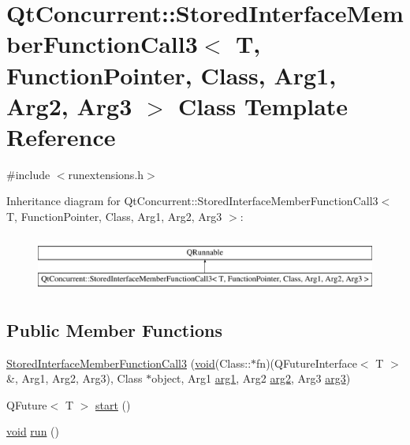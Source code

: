 \hypertarget{class_qt_concurrent_1_1_stored_interface_member_function_call3}{\section{Qt\-Concurrent\-:\-:Stored\-Interface\-Member\-Function\-Call3$<$ T, Function\-Pointer, Class, Arg1, Arg2, Arg3 $>$ Class Template Reference}
\label{class_qt_concurrent_1_1_stored_interface_member_function_call3}
}


{\ttfamily \#include $<$runextensions.\-h$>$}

Inheritance diagram for Qt\-Concurrent\-:\-:Stored\-Interface\-Member\-Function\-Call3$<$ T, Function\-Pointer, Class, Arg1, Arg2, Arg3 $>$\-:\begin{figure}[H]
\begin{center}
\leavevmode
\includegraphics[height=1.885522cm]{class_qt_concurrent_1_1_stored_interface_member_function_call3}
\end{center}
\end{figure}
\subsection*{Public Member Functions}
\begin{DoxyCompactItemize}
\item 
\hyperlink{class_qt_concurrent_1_1_stored_interface_member_function_call3_a3d00b369a5301f8c2bebbb5d92214956}{Stored\-Interface\-Member\-Function\-Call3} (\hyperlink{group___u_a_v_objects_plugin_ga444cf2ff3f0ecbe028adce838d373f5c}{void}(Class\-::$\ast$fn)(Q\-Future\-Interface$<$ T $>$ \&, Arg1, Arg2, Arg3), Class $\ast$object, Arg1 \hyperlink{glext_8h_a4b247ab422408c1761a36f9034c2585b}{arg1}, Arg2 \hyperlink{glext_8h_a5aee5a44bf92a9837fea48e41ef0df57}{arg2}, Arg3 \hyperlink{glext_8h_a525a52cc20e1aa70741e5c7dae172f25}{arg3})
\item 
Q\-Future$<$ T $>$ \hyperlink{class_qt_concurrent_1_1_stored_interface_member_function_call3_a0b245d90811f994319be044d9450c41b}{start} ()
\item 
\hyperlink{group___u_a_v_objects_plugin_ga444cf2ff3f0ecbe028adce838d373f5c}{void} \hyperlink{class_qt_concurrent_1_1_stored_interface_member_function_call3_ac6f859dc60f607efad6801d43cd4f75f}{run} ()
\end{DoxyCompactItemize}


